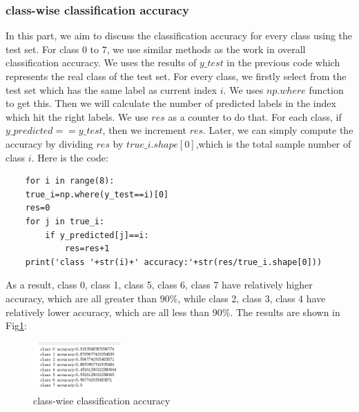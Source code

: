 \documentclass[conference]{IEEEtran}
\begin{document}
\subsubsection{class-wise classification accuracy}
In this part, we aim to discuss the classification accuracy for every class using the test set. 
For class $0$ to $7$, we use similar methods as the work in overall classification accuracy. 
We uses the results of $y\_test$ in the previous code which represents the real class of the test set. For every class, we firstly select from the test set which has the same label as current index $i$.
We uses $np.where$ function to get this. Then we will calculate the number of predicted labels in the index which hit the right labels. We use $res$ as a counter to do that.
For each class, if $y\_predicted == y\_test$, then we increment $res$.
Later, we can simply compute the accuracy by dividing $res$ by $true\_i.shape[0]$,which is the total sample number of class $i$.
Here is the code:
\begin{lstlisting}
    for i in range(8):
    true_i=np.where(y_test==i)[0]
    res=0
    for j in true_i:
        if y_predicted[j]==i:
            res=res+1
    print('class '+str(i)+' accuracy:'+str(res/true_i.shape[0]))
\end{lstlisting}
As a result, class 0, class 1, class 5, class 6, class 7 have relatively higher accuracy, which are all greater than $90\%$, while class 2, class 3, class 4 have relatively lower accuracy, which are all less than $90\%$.
The results are shown in Fig\ref{Fig.t3q2}:
\begin{figure}[h] 
    \centering
    \includegraphics[width=0.3\textwidth]{T3Q1b.png}
    \caption{class-wise classification accuracy} 
    \label{Fig.t3q2} 
\end{figure}
\end{document}
